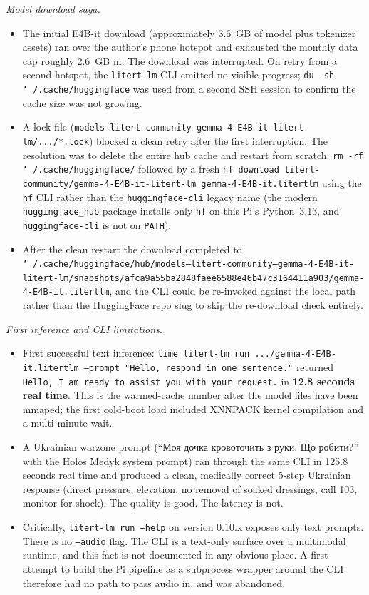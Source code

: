\documentclass{article}
\theoremstyle{plain}
\theoremstyle{definition}
\theoremstyle{remark}
\begin{document}
\textit{Model download saga.}
\begin{itemize}
\item The initial E4B-it download (approximately 3.6~GB of model plus tokenizer assets) ran over the author's phone hotspot and exhausted the monthly data cap roughly 2.6~GB in. The download was interrupted. On retry from a second hotspot, the \texttt{litert-lm} CLI emitted no visible progress; \texttt{du -sh \char`~/.cache/huggingface} was used from a second SSH session to confirm the cache size was not growing.
\item A lock file (\texttt{models--litert-community--gemma-4-E4B-it-litert-lm/.../*.lock}) blocked a clean retry after the first interruption. The resolution was to delete the entire hub cache and restart from scratch: \texttt{rm -rf \char`~/.cache/huggingface/} followed by a fresh \texttt{hf download litert-community/gemma-4-E4B-it-litert-lm gemma-4-E4B-it.litertlm} using the \texttt{hf} CLI rather than the \texttt{huggingface-cli} legacy name (the modern \texttt{huggingface\_hub} package installs only \texttt{hf} on this Pi's Python~3.13, and \texttt{huggingface-cli} is not on \texttt{PATH}).
\item After the clean restart the download completed to \texttt{\char`~/.cache/huggingface/hub/models--litert-community--gemma-4-E4B-it-litert-lm/snapshots/afca9a55ba2848faee6588e46b47c3164411a903/gemma-4-E4B-it.litertlm}, and the CLI could be re-invoked against the local path rather than the HuggingFace repo slug to skip the re-download check entirely.
\end{itemize}

\textit{First inference and CLI limitations.}
\begin{itemize}
\item First successful text inference: \texttt{time litert-lm run .../gemma-4-E4B-it.litertlm --prompt "Hello, respond in one sentence."} returned \texttt{Hello, I am ready to assist you with your request.} in \textbf{12.8 seconds real time}. This is the warmed-cache number after the model files have been mmaped; the first cold-boot load included XNNPACK kernel compilation and a multi-minute wait.
\item A Ukrainian warzone prompt (``Моя дочка кровоточить з руки. Що робити?'' with the Holos Medyk system prompt) ran through the same CLI in 125.8 seconds real time and produced a clean, medically correct 5-step Ukrainian response (direct pressure, elevation, no removal of soaked dressings, call 103, monitor for shock). The quality is good. The latency is not.
\item Critically, \texttt{litert-lm run --help} on version 0.10.x exposes only text prompts. There is no \texttt{--audio} flag. The CLI is a text-only surface over a multimodal runtime, and this fact is not documented in any obvious place. A first attempt to build the Pi pipeline as a subprocess wrapper around the CLI therefore had no path to pass audio in, and was abandoned.
\end{itemize}
\end{document}
